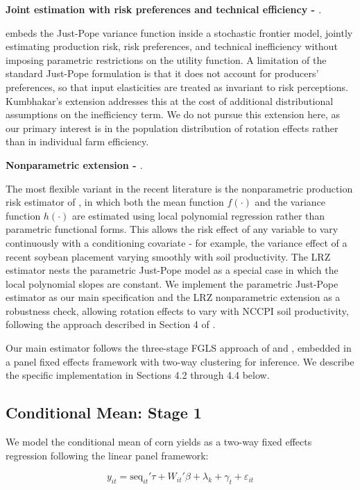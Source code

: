 \documentclass[12pt,letterpaper]{article}
\theoremstyle{remark}
\theoremstyle{remark}
\theoremstyle{plain}
\theoremstyle{definition}
\begin{document}
\medskip\noindent\textbf{Joint estimation with risk preferences and technical efficiency - \cite{Kumbhakar2002}}.

\cite{Kumbhakar2002} embeds the Just-Pope variance function inside a stochastic frontier model, jointly estimating production risk, risk preferences, and technical inefficiency without imposing parametric restrictions on the utility function. A limitation of the standard Just-Pope formulation is that it does not account for producers'  preferences, so that input elasticities are treated as invariant to risk perceptions. Kumbhakar's extension addresses this at the cost of additional distributional assumptions on the inefficiency term. We do not pursue this extension here, as our primary interest is in the population distribution of rotation effects rather than in individual farm efficiency.

\medskip\noindent\textbf{Nonparametric extension - \cite{li2021}}. 

The most flexible variant in the recent literature is the nonparametric production risk estimator of \cite{li2021}, in which both the mean function $f(\cdot)$ and the variance function $h(\cdot)$ are estimated using local polynomial regression rather than parametric functional forms. This allows the risk effect of any variable to vary continuously with a conditioning covariate - for example, the variance effect of a recent soybean placement varying smoothly with soil productivity. The LRZ estimator nests the parametric Just-Pope model as a special case in which the local polynomial slopes are constant. We implement the parametric Just-Pope estimator as our main specification and the LRZ nonparametric extension as a robustness check, allowing rotation effects to vary with NCCPI soil productivity, following the approach described in Section 4 of \cite{li2021}.

Our main estimator follows the three-stage FGLS approach of \cite{Harvey1976} and \cite{Saha1997}, embedded in a panel fixed effects framework with two-way clustering for inference. We describe the specific implementation in Sections 4.2 through 4.4 below.

\subsection{\label{subsec:stage_1}Conditional Mean: Stage 1}
We model the conditional mean of corn yields as a two-way fixed effects regression following the linear panel framework:

\begin{equation}
    y_{it}=\text{seq}_{it}'\tau+ W_{it}'\beta+\lambda_{k}+\gamma_{t}+\varepsilon_{it}\label{eq:stage1}
\end{equation}
\end{document}
